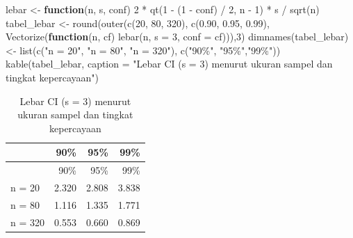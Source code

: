 \documentclass[
  indonesian,
  letterpaper,
]{book}
\newenvironment{Shaded}{\begin{snugshade}}{\end{snugshade}}
\newcommand{\AttributeTok}[1]{\textcolor[rgb]{0.40,0.45,0.13}{#1}}
\newcommand{\ControlFlowTok}[1]{\textcolor[rgb]{0.00,0.23,0.31}{\textbf{#1}}}
\newcommand{\DecValTok}[1]{\textcolor[rgb]{0.68,0.00,0.00}{#1}}
\newcommand{\FloatTok}[1]{\textcolor[rgb]{0.68,0.00,0.00}{#1}}
\newcommand{\FunctionTok}[1]{\textcolor[rgb]{0.28,0.35,0.67}{#1}}
\newcommand{\NormalTok}[1]{\textcolor[rgb]{0.00,0.23,0.31}{#1}}
\newcommand{\OtherTok}[1]{\textcolor[rgb]{0.00,0.23,0.31}{#1}}
\newcommand{\SpecialCharTok}[1]{\textcolor[rgb]{0.37,0.37,0.37}{#1}}
\newcommand{\StringTok}[1]{\textcolor[rgb]{0.13,0.47,0.30}{#1}}
\begin{document}
\begin{Shaded}
\begin{Highlighting}[]
\NormalTok{lebar }\OtherTok{\textless{}{-}} \ControlFlowTok{function}\NormalTok{(n, s, conf) }\DecValTok{2} \SpecialCharTok{*} \FunctionTok{qt}\NormalTok{(}\DecValTok{1} \SpecialCharTok{{-}}\NormalTok{ (}\DecValTok{1} \SpecialCharTok{{-}}\NormalTok{ conf) }\SpecialCharTok{/} \DecValTok{2}\NormalTok{, n }\SpecialCharTok{{-}} \DecValTok{1}\NormalTok{) }\SpecialCharTok{*}\NormalTok{ s }\SpecialCharTok{/} \FunctionTok{sqrt}\NormalTok{(n)}
\NormalTok{tabel\_lebar }\OtherTok{\textless{}{-}} \FunctionTok{round}\NormalTok{(}\FunctionTok{outer}\NormalTok{(}\FunctionTok{c}\NormalTok{(}\DecValTok{20}\NormalTok{, }\DecValTok{80}\NormalTok{, }\DecValTok{320}\NormalTok{), }\FunctionTok{c}\NormalTok{(}\FloatTok{0.90}\NormalTok{, }\FloatTok{0.95}\NormalTok{, }\FloatTok{0.99}\NormalTok{),}
\FunctionTok{Vectorize}\NormalTok{(}\ControlFlowTok{function}\NormalTok{(n, cf) }\FunctionTok{lebar}\NormalTok{(n, }\AttributeTok{s =} \DecValTok{3}\NormalTok{, }\AttributeTok{conf =}\NormalTok{ cf))),}\DecValTok{3}\NormalTok{)}
\FunctionTok{dimnames}\NormalTok{(tabel\_lebar) }\OtherTok{\textless{}{-}} \FunctionTok{list}\NormalTok{(}\FunctionTok{c}\NormalTok{(}\StringTok{"n = 20"}\NormalTok{, }\StringTok{"n = 80"}\NormalTok{, }\StringTok{"n = 320"}\NormalTok{), }\FunctionTok{c}\NormalTok{(}\StringTok{"90\%"}\NormalTok{, }\StringTok{"95\%"}\NormalTok{,}\StringTok{"99\%"}\NormalTok{))}
\FunctionTok{kable}\NormalTok{(tabel\_lebar, }\AttributeTok{caption =} \StringTok{"Lebar CI (s = 3) menurut ukuran sampel dan tingkat kepercayaan"}\NormalTok{)}
\end{Highlighting}
\end{Shaded}

\begin{longtable}[]{@{}lrrr@{}}
\caption{Lebar CI (s = 3) menurut ukuran sampel dan tingkat
kepercayaan}\tabularnewline
\toprule\noalign{}
& 90\% & 95\% & 99\% \\
\midrule\noalign{}
\endfirsthead
\toprule\noalign{}
& 90\% & 95\% & 99\% \\
\midrule\noalign{}
\endhead
\bottomrule\noalign{}
\endlastfoot
n = 20 & 2.320 & 2.808 & 3.838 \\
n = 80 & 1.116 & 1.335 & 1.771 \\
n = 320 & 0.553 & 0.660 & 0.869 \\
\end{longtable}

\end{document}
